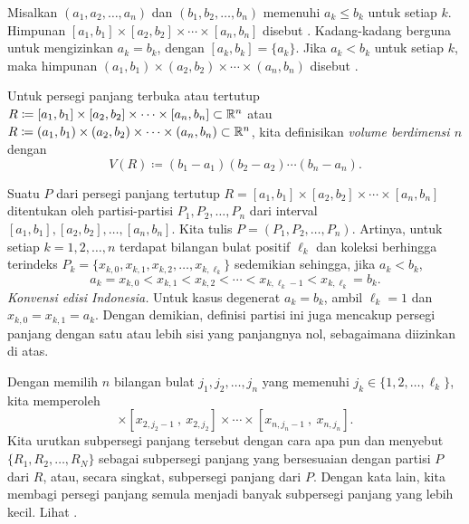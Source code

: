 \begin{defn}
Misalkan $(a_1,a_2,\ldots,a_n)$ dan
$(b_1,b_2,\ldots,b_n)$ memenuhi $a_k \leq b_k$ untuk setiap $k$.
Himpunan
$[a_1,b_1] \times
[a_2,b_2] \times \cdots \times
[a_n,b_n]$ disebut \emph{}%
.
Kadang-kadang berguna untuk mengizinkan $a_k = b_k$, dengan
$[a_k,b_k] = \{ a_k \}$.
Jika $a_k < b_k$ untuk setiap $k$, maka himpunan
$(a_1,b_1) \times
(a_2,b_2) \times \cdots \times
(a_n,b_n)$ disebut \emph{}.

Untuk persegi panjang terbuka atau tertutup
$R \coloneqq [a_1,b_1] \times
[a_2,b_2] \times \cdots \times
[a_n,b_n] \subset {\mathbb{R}}^n$
atau
$R \coloneqq (a_1,b_1) \times
(a_2,b_2) \times \cdots \times
(a_n,b_n) \subset {\mathbb{R}}^n$,
kita definisikan
\emph{volume berdimensi $n$}%
%
 dengan
\begin{equation*}
V(R) \coloneqq
(b_1-a_1)
(b_2-a_2)
\cdots
(b_n-a_n) .
\end{equation*}

Suatu \emph{} $P$ dari persegi panjang tertutup
$R = [a_1,b_1] \times
[a_2,b_2] \times \cdots \times
[a_n,b_n]$
ditentukan oleh partisi-partisi $P_1,P_2,\ldots,P_n$ dari interval
$[a_1,b_1], [a_2,b_2],\ldots, [a_n,b_n]$.
Kita tulis $P=(P_1,P_2,\ldots,P_n)$.
Artinya, untuk setiap $k=1,2,\ldots,n$ terdapat bilangan bulat positif
$\ell_k$ dan koleksi berhingga terindeks
$P_k = \{ x_{k,0},x_{k,1},x_{k,2},\ldots,x_{k,\ell_k} \}$ sedemikian sehingga,
jika $a_k<b_k$,
\begin{equation*}
a_k = x_{k,0} < x_{k,1} < x_{k,2} < \cdots < x_{k,{\ell_k}-1} < x_{k,\ell_k} = b_k .
\end{equation*}
\emph{Konvensi edisi Indonesia.} Untuk kasus degenerat $a_k=b_k$, ambil
$\ell_k=1$ dan $x_{k,0}=x_{k,1}=a_k$. Dengan demikian, definisi partisi ini
juga mencakup persegi panjang dengan satu atau lebih sisi yang panjangnya nol,
sebagaimana diizinkan di atas.

Dengan memilih $n$ bilangan bulat $j_1,j_2,\ldots,j_n$ yang memenuhi
$j_k \in \{ 1,2,\ldots,\ell_k \}$, kita memperoleh
\emph{}
\begin{equation*}
[x_{1,j_1-1}~,~ x_{1,j_1}]
\times
[x_{2,j_2-1}~,~ x_{2,j_2}]
\times
\cdots
\times
[x_{n,j_n-1}~,~ x_{n,j_n}] .
\end{equation*}
Kita urutkan subpersegi panjang tersebut dengan cara apa pun dan menyebut
$\{R_1,R_2,\ldots,R_N\}$ sebagai subpersegi panjang yang bersesuaian dengan
partisi $P$ dari $R$, atau, secara singkat, subpersegi panjang dari $P$.
Dengan kata lain, kita membagi persegi panjang semula menjadi banyak
subpersegi panjang yang lebih kecil. Lihat .


\end{defn}
